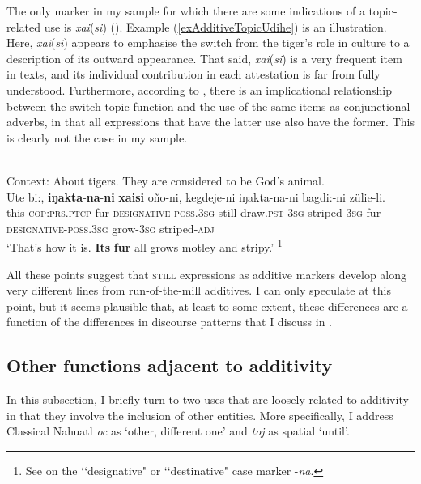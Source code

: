The only marker in my sample for which there are some indications of a topic-related use is  \mbox{\textit{xai}(\textit{si})} (). Example (\ref{exAdditiveTopicUdihe}) is an illustration. Here, \mbox{\textit{xai}(\textit{si})} appears to emphasise the switch from the tiger's role in culture to a description of its outward appearance. That said, \mbox{\textit{xai}(\textit{si})} is a very frequent item in texts, and its individual contribution in each attestation is far from fully understood. Furthermore, according to \textcite{Forker2016}, there is an implicational relationship between the switch topic function and the use of the same items as conjunctional adverbs, in that all expressions that have the latter use also have the former. This is clearly not the case in my sample.

\begin{exe}
	\ex {}\label{exAdditiveTopicUdihe}\\
	 Context: About tigers. They are considered to be God’s animal.\\
	\gll Ute bi:, \textbf{iŋakta}-\textbf{na}-\textbf{ni} \textbf{xaisi} oño-ni, kegdeje-ni iŋakta-na-ni bagdi:-ni zülie-li.\\
	this \textsc{cop}:\textsc{prs}.\textsc{ptcp} fur-\textsc{designative}-\textsc{poss}.3\textsc{sg} still draw.\textsc{pst}-3\textsc{sg} striped-3\textsc{sg} fur-\textsc{designative}-\textsc{poss}.3\textsc{sg} grow-3\textsc{sg} striped-\textsc{adj}\\
	\glt \lq That’s how it is. \textbf{Its} \textbf{fur} all grows motley and stripy.' \parencite[The tiger for the Udihe people]{NikolaevaEtAl2019}\footnote{See \textcite[126–127]{NikolaevaTolskaya2001} on the \lq\lq designative" or \lq\lq destinative" case marker \mbox{-\textit{na}}.}
\end{exe}

All these points suggest that \textsc{still} expressions as additive markers develop along very different lines from run-of-the-mill additives. I can only speculate at this point, but it seems plausible that, at least to some extent, these differences are a function of the differences in discourse patterns that I discuss in .

\subsection{Other functions adjacent to additivity}\label{sectionAdditiveRemnantUses}
In this subsection, I briefly turn to two uses that are loosely related to additivity in that they involve the inclusion of other entities. More specifically, I address Classical Nahuatl \textit{oc} as \lq other, different one\rq{ }and  \textit{toj} as spatial \lq until\rq{}.

